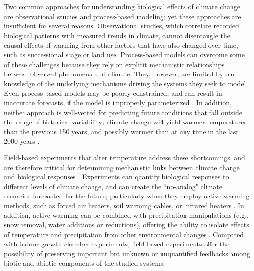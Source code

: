 \documentclass{article}
\begin{document}
\par Two common approaches for understanding biological effects of climate change are observational studies and process-based modeling; yet these approaches are insufficient for several reasons. Observational studies, which correlate recorded biological patterns with measured trends in climate, cannot disentangle the causal effects of warming from other factors that have also changed over time, such as successional stage or land use. Process-based models can overcome some of these challenges because they rely on explicit mechanistic relationships between observed phenomena and climate. %
They, however, are limited by our knowledge of the underlying mechanisms driving the systems they seek to model. Even process-based models may be poorly constrained, and can result in inaccurate forecasts, if the model is improperly parameterized \citep [e.g.,][]{pearson2004,hampe2004,ibanez2006,swab2012,chuine2016}. In addition, neither approach is well-vetted for predicting future conditions that fall outside the range of historical variability; climate change will yield warmer temperatures than the previous 150 years, and possibly warmer than at any time in the last 2000 years \citep{ohlemuller2006,williams2007,williams2007b,ipcc2013}.  

\par Field-based experiments that alter temperature address these shortcomings, and are therefore critical for determining mechanistic links between climate change and biological responses \citep[e.g.,][]{box1978,williams2007,gelman2014}. Experiments can quantify biological responses to different levels of climate change, and can create the ``no-analog" climate scenarios forecasted for the future, particularly when they employ active warming methods, such as forced air heaters, soil warming cables, or infrared heaters \citep{shaver2000,williams2007b,aronson2009}. In addition, active warming can be combined with precipitation manipulations (e.g., snow removal, water additions or reductions), offering the ability to isolate effects of temperature and precipitation from other environmental changes \citep [e.g.,][]{price1998,cleland2006,sherry2007,rollinson2012}. %
Compared with indoor growth-chamber experiments, field-based experiments offer the possibility of preserving important but unknown or unquantified feedbacks among biotic and abiotic components of the studied systems. %
\end{document}
